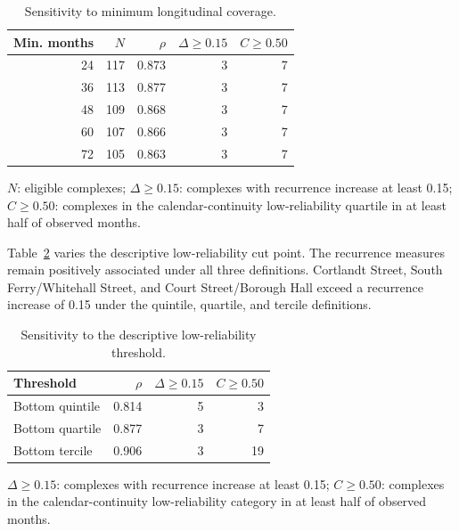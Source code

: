 \documentclass[preprint,12pt]{elsarticle}
\begin{document}
\begin{table}[htbp]
\centering
\caption{Sensitivity to minimum longitudinal coverage.}
\label{tab:s2}
\footnotesize
\begin{threeparttable}
\begin{tabular}{@{}rrrrr@{}}
\toprule
Min. months & $N$ & $\rho$ & $\Delta\geq0.15$ & $C\geq0.50$ \\
\midrule
24 & 117 & 0.873 & 3 & 7 \\
36 & 113 & 0.877 & 3 & 7 \\
48 & 109 & 0.868 & 3 & 7 \\
60 & 107 & 0.866 & 3 & 7 \\
72 & 105 & 0.863 & 3 & 7 \\
\bottomrule
\end{tabular}
\begin{tablenotes}
\raggedright\scriptsize
\item $N$: eligible complexes; $\Delta\geq0.15$: complexes with recurrence increase at least 0.15; $C\geq0.50$: complexes in the calendar-continuity low-reliability quartile in at least half of observed months.
\end{tablenotes}
\end{threeparttable}
\end{table}

Table~\ref{tab:s3} varies the descriptive low-reliability cut point. The recurrence measures remain positively associated under all three definitions. Cortlandt Street, South Ferry/Whitehall Street, and Court Street/Borough Hall exceed a recurrence increase of 0.15 under the quintile, quartile, and tercile definitions.

\begin{table}[htbp]
\centering
\caption{Sensitivity to the descriptive low-reliability threshold.}
\label{tab:s3}
\footnotesize
\begin{threeparttable}
\begin{tabular}{@{}lrrr@{}}
\toprule
Threshold & $\rho$ & $\Delta\geq0.15$ & $C\geq0.50$ \\
\midrule
Bottom quintile & 0.814 & 5 & 3 \\
Bottom quartile & 0.877 & 3 & 7 \\
Bottom tercile & 0.906 & 3 & 19 \\
\bottomrule
\end{tabular}
\begin{tablenotes}
\raggedright\scriptsize
\item $\Delta\geq0.15$: complexes with recurrence increase at least 0.15; $C\geq0.50$: complexes in the calendar-continuity low-reliability category in at least half of observed months.
\end{tablenotes}
\end{threeparttable}
\end{table}
\end{document}
